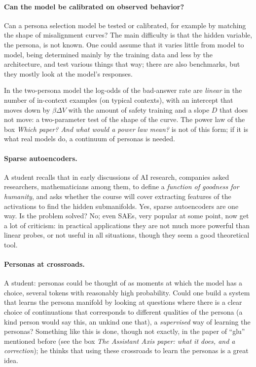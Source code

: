 \paragraph{Can the model be calibrated on observed behavior?}
Can a persona selection model be tested or calibrated, for example by matching the shape of misalignment curves? The main difficulty is that the hidden variable, the persona, is not known. One could assume that it varies little from model to model, being determined mainly by the training data and less by the architecture, and test various things that way; there are also benchmarks, but they mostly look at the model's responses.

\begin{beyond}\label{box:L7-calib}
In the two-persona model the log-odds of the bad-answer rate are \emph{linear} in the number of in-context examples (on typical contexts), with an intercept that moves down by $\beta\Delta V$ with the amount of safety training and a slope $D$ that does not move: a two-parameter test of the shape of the curve. The power law of the box \emph{Which paper? And what would a power law mean?} is not of this form; if it is what real models do, a continuum of personas is needed.
\end{beyond}

\paragraph{Sparse autoencoders.}
A student recalls that in early discussions of AI research, companies asked researchers, mathematicians among them, to define a \emph{function of goodness for humanity}, and asks whether the course will cover extracting features of the activations to find the hidden submanifolds. Yes, sparse autoencoders are one way. Is the problem solved? No; even SAEs, very popular at some point, now get a lot of criticism: in practical applications they are not much more powerful than linear probes, or not useful in all situations, though they seem a good theoretical tool.

\paragraph{Personas at crossroads.}
A student: personas could be thought of as moments at which the model has a choice, several tokens with reasonably high probability. Could one build a system that learns the persona manifold by looking at questions where there is a clear choice of continuations that corresponds to different qualities of the persona (a kind person would say this, an unkind one that), a \emph{supervised} way of learning the personas? Something like this is done, though not exactly, in the paper of ``glu'' mentioned before (see the box \emph{The Assistant Axis paper: what it does, and a correction}); he thinks that using these crossroads to learn the personas is a great idea.

